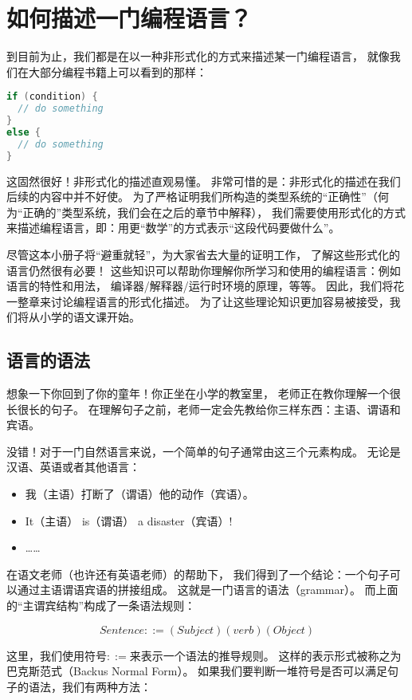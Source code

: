 \documentclass[../main.tex]{subfiles}
\begin{document}
  \section{如何描述一门编程语言？}
  \indent 到目前为止，我们都是在以一种非形式化的方式来描述某一门编程语言，
  就像我们在大部分编程书籍上可以看到的那样：

\begin{lstlisting}[language=c]
if (condition) {
  // do something
}
else {
  // do something
}
\end{lstlisting}

  \indent 这固然很好！非形式化的描述直观易懂。
  非常可惜的是：非形式化的描述在我们后续的内容中并不好使。
  为了严格证明我们所构造的类型系统的“正确性”（何为“正确的”类型系统，我们会在之后的章节中解释），
  我们需要使用形式化的方式来描述编程语言，即：用更“数学”的方式表示“这段代码要做什么”。

  \indent 尽管这本小册子将“避重就轻”，为大家省去大量的证明工作，
  了解这些形式化的语言仍然很有必要！
  这些知识可以帮助你理解你所学习和使用的编程语言：例如语言的特性和用法，
  编译器/解释器/运行时环境的原理，等等。\cite{edu}
  因此，我们将花一整章来讨论编程语言的形式化描述。
  为了让这些理论知识更加容易被接受，我们将从小学的语文课开始。

  \subsection{语言的语法}
  \indent 想象一下你回到了你的童年！你正坐在小学的教室里，
  老师正在教你理解一个很长很长的句子。
  在理解句子之前，老师一定会先教给你三样东西：主语、谓语和宾语。
  
  \indent 没错！对于一门自然语言来说，一个简单的句子通常由这三个元素构成。
  无论是汉语、英语或者其他语言：

  \begin{itemize}
    \item 我（主语）打断了（谓语）他的动作（宾语）。
    \item It（主语） is（谓语） a disaster（宾语）!
    \item ……
  \end{itemize}

  \indent 在语文老师（也许还有英语老师）的帮助下，
  我们得到了一个结论：一个句子可以通过主语谓语宾语的拼接组成。
  这就是一门语言的语法（grammar）。
  而上面的“主谓宾结构”构成了一条语法规则：

  $$Sentence ::= (Subject) (verb) (Object)$$

  \indent 这里，我们使用符号$::=$来表示一个语法的推导规则。
  这样的表示形式被称之为巴克斯范式（Backus Normal Form）。\cite{bnfwiki}
  如果我们要判断一堆符号是否可以满足句子的语法，我们有两种方法：
\end{document}
